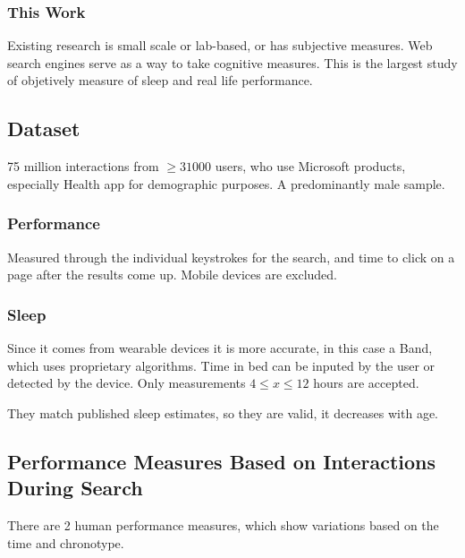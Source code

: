 \documentclass{IEEEtran}
\begin{document}
      \subsubsection{This Work}
        Existing research is small scale or lab-based, or has subjective measures. Web search engines serve as a way to take cognitive measures. This is the largest study of objetively measure of sleep and real life performance.
    \subsection{Dataset}
      75 million interactions from $\geq 31000$ users, who use Microsoft products, especially Health app for demographic purposes. A predominantly male sample.\par 
      \subsubsection{Performance}
        Measured through the individual keystrokes for the search, and time to click on a page after the results come up. Mobile devices are excluded.
      \subsubsection{Sleep}
        Since it comes from wearable devices it is more accurate, in this case a Band, which uses proprietary algorithms. Time in bed can be inputed by the user or detected by the device. Only measurements $4 \leq x \leq 12$ hours are accepted.\par 
        They match published sleep estimates, so they are valid, it decreases with age.
    \subsection{Performance Measures Based on Interactions During Search}
      There are 2 human performance measures, which show variations based on the time and chronotype. 
\end{document}
